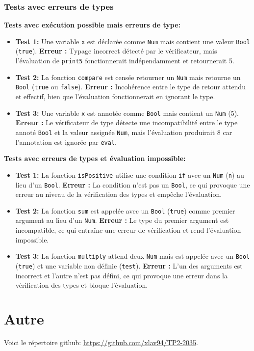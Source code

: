 \documentclass{article}
\begin{document}
\subsubsection{Tests avec erreurs de types}
\textbf{Tests avec exécution possible mais erreurs de type:}  
\begin{itemize}

\item \textbf{Test 1:}
Une variable \texttt{x} est déclarée comme \texttt{Num} mais contient une valeur \texttt{Bool} (\texttt{true}).
\textbf{Erreur :} Typage incorrect détecté par le vérificateur, mais l'évaluation de \texttt{print5} fonctionnerait indépendamment et retournerait 5.

\item \textbf{Test 2:}
La fonction \texttt{compare} est censée retourner un \texttt{Num} mais retourne un \texttt{Bool} (\texttt{true} ou \texttt{false}).
\textbf{Erreur :} Incohérence entre le type de retour attendu et effectif, bien que l'évaluation fonctionnerait en ignorant le type.

\item \textbf{Test 3:}
Une variable \texttt{x} est annotée comme \texttt{Bool} mais contient un \texttt{Num} (5).
\textbf{Erreur :} Le vérificateur de type détecte une incompatibilité entre le type annoté \texttt{Bool} et la valeur assignée \texttt{Num}, mais l'évaluation produirait 8 car l'annotation est ignorée par \texttt{eval}.

\end{itemize} 
 
  

\textbf{Tests avec erreurs de types et évaluation impossible:}  
\begin{itemize}

\item \textbf{Test 1:}
La fonction \texttt{isPositive} utilise une condition \texttt{if} avec un \texttt{Num} (\texttt{n}) au lieu d'un \texttt{Bool}.
\textbf{Erreur :} La condition n'est pas un \texttt{Bool}, ce qui provoque une erreur au niveau de la vérification des types et empêche l'évaluation.

\item \textbf{Test 2:}
La fonction \texttt{sum} est appelée avec un \texttt{Bool} (\texttt{true}) comme premier argument au lieu d'un \texttt{Num}.
\textbf{Erreur :} Le type du premier argument est incompatible, ce qui entraîne une erreur de vérification et rend l'évaluation impossible.

\item \textbf{Test 3:}
La fonction \texttt{multiply} attend deux \texttt{Num} mais est appelée avec un \texttt{Bool} (\texttt{true}) et une variable non définie (\texttt{test}).
\textbf{Erreur :} L'un des arguments est incorrect et l'autre n'est pas défini, ce qui provoque une erreur dans la vérification des types et bloque l'évaluation.

\end{itemize}

\section{Autre}
Voici le répertoire github: \href{https://github.com/xlav94/TP2-2035}{https://github.com/xlav94/TP2-2035}.
\end{document}
